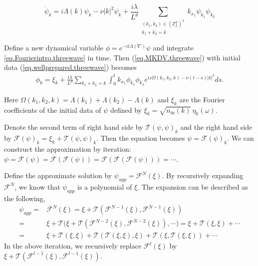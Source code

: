 \begin{equation}\label{eq.Fourierintro.threewave}
\dot{\psi}_{k} =  i\Lambda(k) \psi_k -\nu |k|^2 \psi_k
 +\frac{i\lambda}{L^{d}} \sum\limits_{\substack{(k_1,k_2) \in (\mathbb{Z}^d_L)^2 \\ k_1 + k_2 = k}} k_{x_1}\psi_{k_1} \psi_{k_2}
\end{equation}



Define a new dynamical variable $\phi= e^{-it\Lambda(\nabla)} \psi$ and integrate \eqref{eq.Fourierintro.threewave} in time. Then (\ref{eq.MKDV.threewave}) with initial data (\ref{eq.wellprepared.threewave}) becomes
\begin{equation}\label{eq.intmainintro.threewave}
\begin{split}
    \phi_k =\xi_k+\frac{i\lambda}{L^{d}} \sum\limits_{k_1 + k_2 = k}\int^{t}_0k_{x_1}\phi_{k_1} \phi_{k_2}e^{i s\Omega(k_1,k_2,k)-\nu(t-s)|k|^2} ds.  
\end{split}
\end{equation}

Here $\Omega(k_1,k_2,k) =\Lambda(k_1)+\Lambda(k_2)-\Lambda(k)$ and $\xi_k$ are the Fourier coefficients of the initial data of $\psi$ defined by $\xi_k=\sqrt{n_{\textrm{in}}(k)} \, \eta_{k}(\omega)$.



Denote the second term of right hand side by $\mathcal{T}(\psi,\psi)_k$ and the right hand side by $\mathcal{F}(\psi)_k=\xi_k+\mathcal{T}(\psi,\psi)_k$. Then the equation becomes $\psi=\mathcal{F}(\psi)_k$. We can construct the approximation by iteration: $\psi=\mathcal{F}(\psi)=\mathcal{F}(\mathcal{F}(\psi))=\mathcal{F}(\mathcal{F}(\mathcal{F}(\psi)))=\cdots$. 

Define the approximate solution by $\psi_{app}=\mathcal{F}^{N}(\xi)$. By recursively expanding  $\mathcal{F}^{N}$, we know that $\psi_{app}$ is a polynomial of $\xi$.
The expansion can be described as the following,
\begin{equation*}
\begin{split}
    \psi_{app}=&\mathcal{F}^{N}(\xi)=\xi+\mathcal{T}(\mathcal{F}^{N-1}(\xi),\mathcal{F}^{N-1}(\xi))
    \\
    =&\xi+\mathcal{T}\Big(\xi+\mathcal{T}(\mathcal{F}^{N-2}(\xi),\mathcal{F}^{N-2}(\xi)),
    \cdots\Big)=\xi+\mathcal{T}(\xi,\xi)+\cdots
    \\
    =&\xi+\mathcal{T}(\xi,\xi)+\mathcal{T}(\mathcal{T}(\xi,\xi),\xi)
    +\mathcal{T}(\xi,\mathcal{T}(\xi,\xi))+\cdots
\end{split}    
\end{equation*}
In the above iteration, we recursively replace $\mathcal{F}^{l}(\xi)$ by $\xi+\mathcal{T}(\mathcal{F}^{l-1}(\xi),\mathcal{F}^{l-1}(\xi))$.

